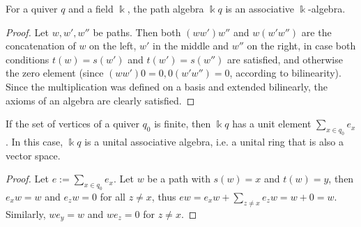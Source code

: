 \begin{lemma}\label{la:path_algebra_is_ass_algebra}
For a quiver $q$ and a field $\Bbbk$, the path algebra $\Bbbk q$ is an associative $\Bbbk$-algebra.
\end{lemma}
\begin{proof}
Let $w, w', w''$ be paths. Then both $(ww')w''$ and $w(w'w'')$ are the concatenation of $w$ on the left,
$w'$ in the middle and $w''$ on the right, in case both conditions $t(w) = s(w')$ and $t(w') = s(w'')$ are satisfied, and
otherwise the zero element (since $(ww')0 = 0, 0(w'w'') = 0$, according to bilinearity).\\
Since the multiplication was defined on a basis and extended bilinearly, the axioms of an algebra are clearly satisfied.
\end{proof}

\begin{lemma}\label{la:unit_in_path_algebra}
If the set of vertices of a quiver $q_{0}$ is finite, then $\Bbbk q$ has a unit element $\sum_{x\in q_{0}} e_{x}$. In this case, $\Bbbk q$ is a unital
associative algebra, i.e. a unital ring that is also a vector space.
\end{lemma}
\begin{proof}
Let $e := \sum_{x\in q_{0}} e_{x}$. Let $w$ be a path with $s(w) = x$ and $t(w) = y$, then $e_{x}w = w$ and $e_{z}w = 0$ for all $z \neq x$,
thus $ew = e_{x}w + \sum_{z\neq x} e_{z}w = w + 0 = w$. Similarly, $we_{y} = w$ and $we_{z} = 0$ for $z \neq x$.
\end{proof}


